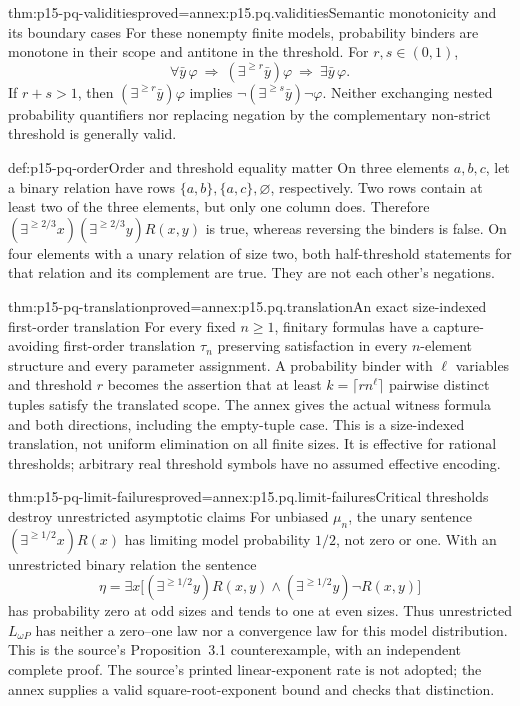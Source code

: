 \begin{hbtheorem}{thm:p15-pq-validities}{proved=annex:p15.pq.validities}{Semantic monotonicity and its boundary cases}
For these nonempty finite models, probability binders are monotone
in their scope and antitone in the threshold. For \(r,s\in(0,1)\),
\[
 \forall\bar y\,\varphi\ \Longrightarrow\
 (\exists^{\ge r}\bar y)\varphi\ \Longrightarrow\
 \exists\bar y\,\varphi.
\]
If \(r+s>1\), then
\((\exists^{\ge r}\bar y)\varphi\) implies
\(\neg(\exists^{\ge s}\bar y)\neg\varphi\).
Neither exchanging nested probability quantifiers nor replacing
negation by the complementary non-strict threshold is generally valid.
\end{hbtheorem}

\begin{hbexample}{def:p15-pq-order}{Order and threshold equality matter}
On three elements \(a,b,c\), let a binary relation have rows
\(\{a,b\},\{a,c\},\varnothing\), respectively.
Two rows contain at least two of the three elements, but only one column
does. Therefore
\((\exists^{\ge2/3}x)(\exists^{\ge2/3}y)R(x,y)\) is true,
whereas reversing the binders is false. On four elements with a unary
relation of size two, both half-threshold statements for that relation
and its complement are true. They are not each other's negations.
\end{hbexample}

\begin{hbtheorem}{thm:p15-pq-translation}{proved=annex:p15.pq.translation}{An exact size-indexed first-order translation}
For every fixed \(n\ge1\), finitary formulas have a capture-avoiding
first-order translation \(\tau_n\) preserving satisfaction in every
\(n\)-element structure and every parameter assignment.
A probability binder with \(\ell\) variables and threshold \(r\)
becomes the assertion that at least
\(k=\lceil rn^\ell\rceil\) pairwise distinct tuples satisfy the
translated scope. The annex gives the actual witness formula and both
directions, including the empty-tuple case.
This is a size-indexed translation, not uniform elimination on all
finite sizes. It is effective for rational thresholds; arbitrary real
threshold symbols have no assumed effective encoding.
\end{hbtheorem}

\begin{hbtheorem}{thm:p15-pq-limit-failures}{proved=annex:p15.pq.limit-failures}{Critical thresholds destroy unrestricted asymptotic claims}
For unbiased \(\mu_n\), the unary sentence
\((\exists^{\ge1/2}x)R(x)\) has limiting model probability \(1/2\),
not zero or one. With an unrestricted binary relation the sentence
\[
 \eta=\exists x\bigl[
  (\exists^{\ge1/2}y)R(x,y)\land
  (\exists^{\ge1/2}y)\neg R(x,y)\bigr]
\]
has probability zero at odd sizes and tends to one at even sizes.
Thus unrestricted \(L_{\omega P}\) has neither a zero--one law nor
a convergence law for this model distribution. This is the source's
Proposition~3.1 counterexample, with an independent complete proof.
The source's printed linear-exponent rate is not adopted; the annex
supplies a valid square-root-exponent bound and checks that distinction.
\end{hbtheorem}

